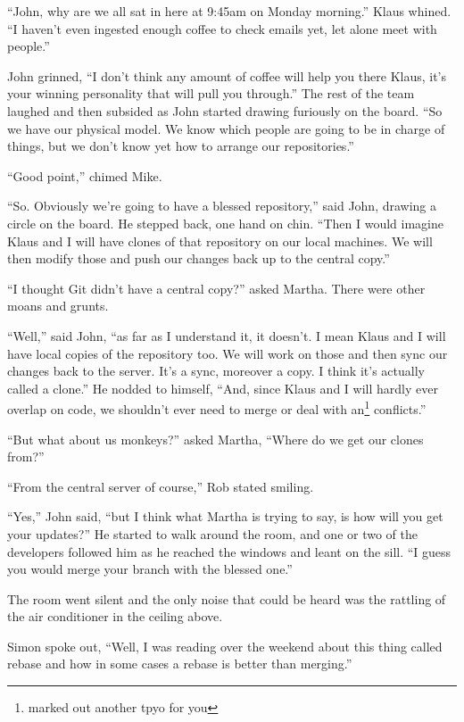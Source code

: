 \begin{trenches}
``John, why are we all sat in here at 9:45am on Monday morning.'' Klaus whined.
``I haven't even ingested enough coffee to check emails yet, let alone meet with people.''

John grinned, ``I don't think any amount of coffee will help you there Klaus, it's your winning personality that will pull you through.''
The rest of the team laughed and then subsided as John started drawing furiously on the board.
``So we have our physical model. We know which people are going to be in charge of things, but we don't know yet how to arrange our repositories.''

``Good point,'' chimed Mike.

``So. Obviously we're going to have a blessed repository,'' said John, drawing a circle on the board.
He stepped back, one hand on chin.
``Then I would imagine Klaus and I will have clones of that repository on our local machines. We will then modify those and push our changes back up to the central copy.''

``I thought Git didn't have a central copy?'' asked Martha.
There were other moans and grunts.

``Well,'' said John,
``as far as I understand it, it doesn't. I mean Klaus and I will have local copies of the repository too. We will work on those and then sync our changes back to the server. It's a sync, moreover a copy. I think it's actually called a clone.''
He nodded to himself, ``And, since Klaus and I will hardly ever overlap on code, we shouldn't ever need to merge or deal with an\footnote{marked out another tpyo for you} conflicts.''

``But what about us monkeys?'' asked Martha,
``Where do we get our clones from?''

``From the central server of course,'' Rob stated smiling.

``Yes,'' John said,
``but I think what Martha is trying to say, is how will you get your updates?''
He started to walk around the room, and one or two of the developers followed him as he reached the windows and leant on the sill.
``I guess you would merge your branch with the blessed one.''

The room went silent and the only noise that could be heard was the rattling of the air conditioner in the ceiling above.

Simon spoke out, ``Well, I was reading over the weekend about this thing called rebase and how in some cases a rebase is better than merging.''


\end{trenches}

